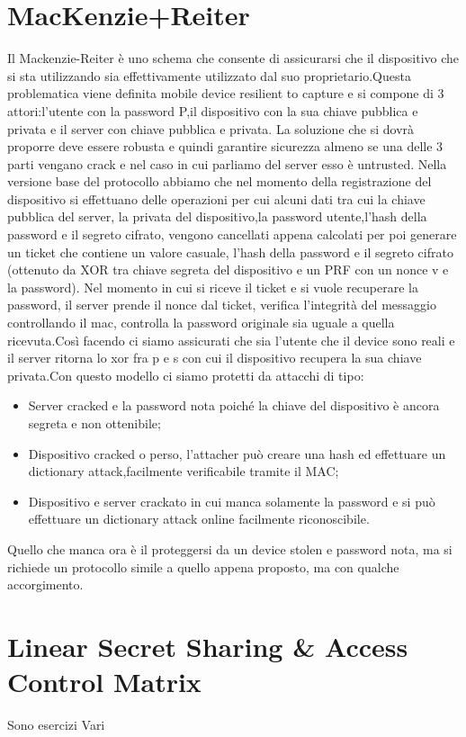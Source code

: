 \documentclass{book}
\begin{document}
\section{MacKenzie+Reiter}
Il Mackenzie-Reiter è uno schema che consente di assicurarsi che il dispositivo che si sta utilizzando sia effettivamente utilizzato dal suo proprietario.Questa problematica viene definita mobile device resilient to capture e si compone di 3 attori:l'utente con la password P,il dispositivo con la sua chiave pubblica e privata e il server con chiave pubblica e privata.
La soluzione che si dovrà proporre deve essere robusta e quindi garantire sicurezza almeno se una delle 3 parti vengano crack e nel caso in cui parliamo del server esso è untrusted\@.\newline
Nella versione base del protocollo abbiamo che  nel momento della registrazione del dispositivo si effettuano delle operazioni per cui alcuni dati tra cui la chiave pubblica del server, la privata del dispositivo,la password utente,l'hash della password e il segreto cifrato, vengono cancellati appena calcolati per poi generare un ticket che contiene un valore casuale, l'hash della password e il segreto cifrato (ottenuto da XOR tra chiave segreta del dispositivo e un PRF con un nonce v e la password).
Nel momento in cui si riceve il ticket e si vuole recuperare la password, il server prende il nonce dal ticket, verifica l'integrità del messaggio controllando il mac, controlla la password originale sia uguale a quella ricevuta.Così facendo ci siamo assicurati che sia l'utente che il device sono reali e il server ritorna lo xor fra p e s con cui il dispositivo recupera la sua chiave privata.Con questo modello ci siamo protetti da attacchi di tipo:\begin{itemize}
    \item Server cracked e la password nota poiché la chiave del dispositivo è ancora segreta e non ottenibile;
    \item Dispositivo cracked o perso, l'attacher può creare una hash ed effettuare un dictionary attack,facilmente verificabile tramite il MAC\@;
    \item Dispositivo e server crackato in cui manca solamente la password e si può effettuare un dictionary attack online facilmente riconoscibile.
\end{itemize}
Quello che manca ora è il proteggersi da un device stolen e password nota, ma si richiede un protocollo simile a quello appena proposto, ma con qualche accorgimento.
\section{Linear Secret Sharing \& Access Control Matrix}
Sono esercizi Vari
\end{document}
